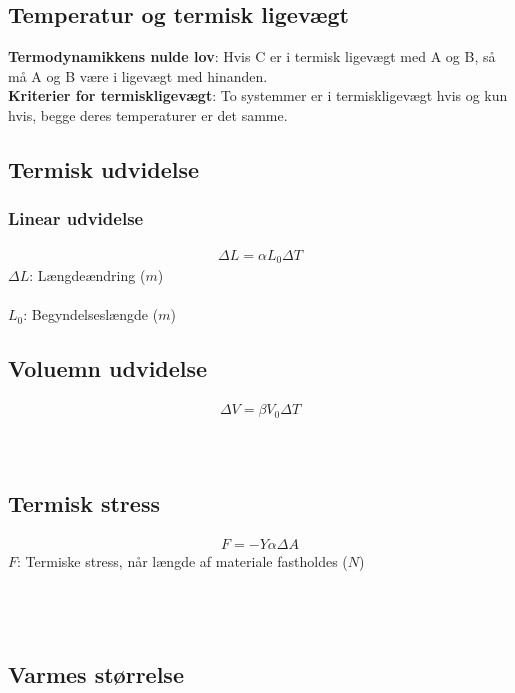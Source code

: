 \subsection{Temperatur og termisk ligevægt}
	\textbf{Termodynamikkens nulde lov}: Hvis C er i termisk ligevægt med A og B, så må A og B være i ligevægt med hinanden.\\
	\textbf{Kriterier for termiskligevægt}: To systemmer er i termiskligevægt hvis og kun hvis, begge deres temperaturer er det samme.\\

\subsection{Termisk udvidelse}
	\subsubsection{Linear udvidelse}
		\begin{align}
			\Delta L=\alpha L_0\Delta T
		\end{align}
		$\Delta L$: Længdeændring ($m$)\\
		\coeflinexp\\
		$L_0$: Begyndelseslængde ($m$)\\
		\tempk

	\subsection{Voluemn udvidelse}
		\begin{align}
			\Delta V=\beta V_0\Delta T
		\end{align}
		\volumen\\
		\coefvolexp\\
		\tempk
	
	\subsection{Termisk stress}
		\begin{align}
			F=-Y\alpha\Delta A
		\end{align}
		$F$: Termiske stress, når længde af materiale fastholdes ($N$)\\
		\youngmod\\
		\coeflinexp\\
		\tempk\\
		\areal
	
\subsection{Varmes størrelse}
